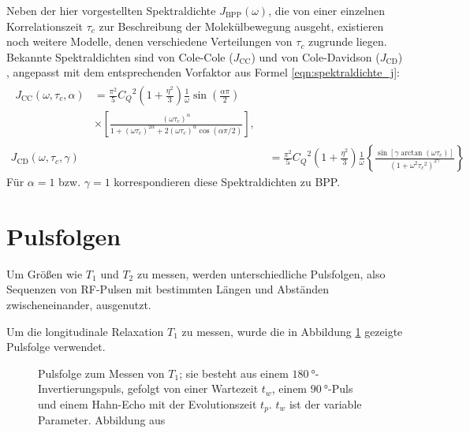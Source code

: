 Neben der hier vorgestellten Spektraldichte $J_\text{BPP}(\omega)$, die von einer einzelnen Korrelationszeit $\tau_c$ zur Beschreibung der Molekülbewegung ausgeht, existieren noch weitere Modelle, denen verschiedene Verteilungen von $\tau_c$ zugrunde liegen. Bekannte Spektraldichten sind von Cole-Cole ($J_\text{CC}$) und von Cole-Davidson ($J_\text{CD}$) \cite[S. 105-108]{beckmann_relaxation}, angepasst mit dem entsprechenden Vorfaktor aus Formel \eqref{eqn:spektraldichte_j}:
\begin{align}
\begin{split}
    J_\text{CC}(\omega, \tau_c, \alpha) &= \frac{\pi^2}{5} {C_Q}^2 \left( 1 + \frac{\eta^2}{3} \right) \frac{1}{\omega} \sin \left( \frac{\alpha \pi}{2} \right) \\ &\times \left[ \frac{(\omega \tau_c)^\alpha}{1 + (\omega \tau_c)^{2\alpha} + 2 (\omega \tau_c)^\alpha \cos (\alpha \pi / 2)} \right], \label{eqn:theo:jcc}
\end{split} \\
    J_\text{CD}(\omega, \tau_c, \gamma) &= \frac{\pi^2}{5} {C_Q}^2 \left( 1 + \frac{\eta^2}{3} \right) \frac{1}{\omega} \left\{ \frac{\sin [\gamma \arctan(\omega \tau_c)]}{(1 + \omega^2 {\tau_c}^2)^{2\gamma}} \right\} \label{eqn:theo:jcd}
\end{align}
Für $\alpha = 1$ bzw. $\gamma = 1$ korrespondieren diese Spektraldichten zu BPP.





\section{Pulsfolgen} \label{section:theo:pulsfolgen}

Um Größen wie $T_1$ und $T_2$ zu messen, werden unterschiedliche Pulsfolgen, also Sequenzen von RF-Pulsen mit bestimmten Längen und Abständen zwischeneinander, ausgenutzt.

Um die longitudinale Relaxation $T_1$ zu messen, wurde die in Abbildung \ref{fig:theo:pulsT1} gezeigte Pulsfolge verwendet.
\begin{figure}
	\begin{center}
		
	\end{center}
    \caption{Pulsfolge zum Messen von $T_1$; sie besteht aus einem $\SI{180}{\degree}$-Invertierungspuls, gefolgt von einer Wartezeit $t_w$, einem $\SI{90}{\degree}$-Puls und einem Hahn-Echo mit der Evolutionszeit $t_p$. $t_w$ ist der variable Parameter. Abbildung aus \cite{joachim_master}}\label{fig:theo:pulsT1}
\end{figure}

